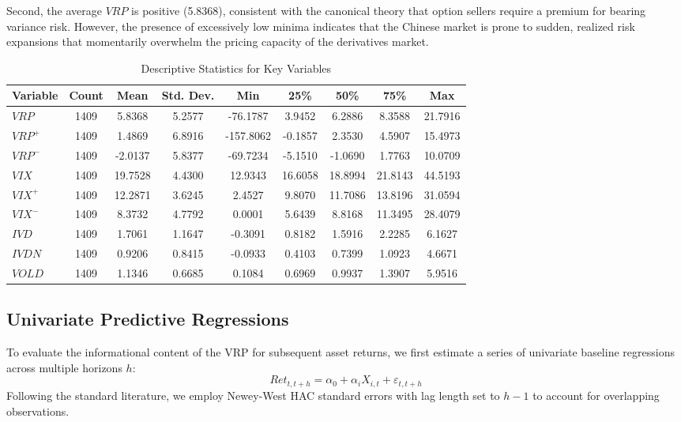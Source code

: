\documentclass[a4paper, 12pt]{article}    %
\begin{document}
Second, the average $VRP$ is positive (5.8368), consistent with the canonical theory that option sellers require a premium for bearing variance risk. However, the presence of excessively low minima indicates that the Chinese market is prone to sudden, realized risk expansions that momentarily overwhelm the pricing capacity of the derivatives market.

\begin{table}[htbp]
\centering
\caption{Descriptive Statistics for Key Variables}
\label{描述性统计}
\footnotesize
\setlength{\tabcolsep}{5pt}
\renewcommand{\arraystretch}{1.2}
\begin{tabular*}{\textwidth}{@{\extracolsep{\fill}}lcccccccc}
\toprule
\textbf{Variable} & \textbf{Count} & \textbf{Mean} & \textbf{Std. Dev.} & \textbf{Min} & \textbf{25\%} & \textbf{50\%} & \textbf{75\%} & \textbf{Max} \\
\midrule
$VRP$      & 1409 & 5.8368  & 5.2577 & -76.1787  & 3.9452  & 6.2886  & 8.3588  & 21.7916 \\
$VRP^+$    & 1409 & 1.4869  & 6.8916 & -157.8062 & -0.1857 & 2.3530  & 4.5907  & 15.4973 \\
$VRP^-$    & 1409 & -2.0137 & 5.8377 & -69.7234  & -5.1510 & -1.0690 & 1.7763  & 10.0709 \\
$VIX$      & 1409 & 19.7528 & 4.4300 & 12.9343   & 16.6058 & 18.8994 & 21.8143 & 44.5193 \\
$VIX^+$    & 1409 & 12.2871 & 3.6245 & 2.4527    & 9.8070  & 11.7086 & 13.8196 & 31.0594 \\
$VIX^-$    & 1409 & 8.3732  & 4.7792 & 0.0001    & 5.6439  & 8.8168  & 11.3495 & 28.4079 \\
$IVD$      & 1409 & 1.7061  & 1.1647 & -0.3091   & 0.8182  & 1.5916  & 2.2285  & 6.1627  \\
$IVDN$     & 1409 & 0.9206  & 0.8415 & -0.0933   & 0.4103  & 0.7399  & 1.0923  & 4.6671  \\
$VOLD$     & 1409 & 1.1346  & 0.6685 & 0.1084    & 0.6969  & 0.9937  & 1.3907  & 5.9516  \\
\bottomrule
\end{tabular*}
\end{table}



\subsection{Univariate Predictive Regressions}
To evaluate the informational content of the VRP for subsequent asset returns, we first estimate a series of univariate baseline regressions across multiple horizons $h$:
\begin{equation} \label{base2}
Ret_{t,t+h} = \alpha_0 + \alpha_i X_{i,t} + \varepsilon_{t,t+h}
\end{equation}
Following the standard literature, we employ Newey-West HAC standard errors \citep{newey1987simple} with lag length set to $h-1$ to account for overlapping observations.
\end{document}
